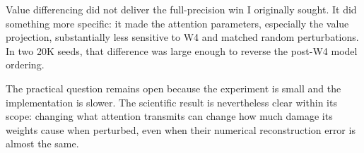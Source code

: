 \documentclass[10pt]{article}
\begin{document}
Value differencing did not deliver the full-precision win I originally sought. It did something more specific: it made the attention parameters, especially the value projection, substantially less sensitive to W4 and matched random perturbations. In two 20K seeds, that difference was large enough to reverse the post-W4 model ordering.

The practical question remains open because the experiment is small and the implementation is slower. The scientific result is nevertheless clear within its scope: changing what attention transmits can change how much damage its weights cause when perturbed, even when their numerical reconstruction error is almost the same.


\end{document}
